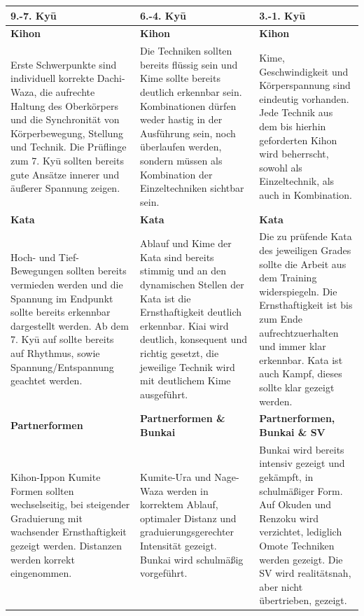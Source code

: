 \documentclass[a5paper,landscape,DIV=calc,11pt,notitlepage]{scrartcl}
\begin{document}
\begin{tcolorbox}[colback=white,colframe=GKD,coltitle=white,adjusted title=Entwicklungsweg entlang der Kyu-Grade]
	\null\vfill\null
	\begin{tabularx}{\linewidth}{XXX}
		9.-7. Ky\={u}	& 6.-4. Ky\={u}	& 3.-1. Ky\={u}\\
		\midrule
		{\footnotesize \textbf{Kihon}}&{\footnotesize \textbf{Kihon}}&{\footnotesize \textbf{Kihon}}\\
		{\footnotesize Erste Schwerpunkte sind individuell korrekte Dachi-Waza, die aufrechte Haltung des Oberkörpers und die Synchronität von Körperbewegung, Stellung und Technik. Die Prüflinge zum 7. Ky\={u} sollten bereits gute Ansätze innerer und äußerer Spannung zeigen.}&{\footnotesize Die Techniken sollten bereits flüssig sein und Kime sollte bereits deutlich erkennbar sein. Kombinationen dürfen weder hastig in der Ausführung sein, noch überlaufen werden, sondern müssen als Kombination der Einzeltechniken sichtbar sein.}&{\footnotesize Kime, Geschwindigkeit und Körperspannung sind eindeutig vorhanden. Jede Technik aus dem bis hierhin geforderten Kihon wird beherrscht, sowohl als Einzeltechnik, als auch in Kombination.}\\
		{\footnotesize \textbf{Kata}}&{\footnotesize \textbf{Kata}}&{\footnotesize \textbf{Kata}}\\
		{\footnotesize Hoch- und Tief-Bewegungen sollten bereits vermieden werden und die Spannung im Endpunkt sollte bereits erkennbar dargestellt werden. Ab dem 7. Ky\={u} auf sollte bereits auf Rhythmus, sowie Spannung/Entspannung geachtet werden.}&{\footnotesize Ablauf und Kime der Kata sind bereits stimmig und an den dynamischen Stellen der Kata ist die Ernsthaftigkeit deutlich erkennbar. Kiai wird deutlich, konsequent und richtig gesetzt, die jeweilige Technik wird mit deutlichem Kime ausgeführt.}&{\footnotesize Die zu prüfende Kata des jeweiligen Grades sollte die Arbeit aus dem Training widerspiegeln. Die Ernsthaftigkeit ist bis zum Ende aufrechtzuerhalten und immer klar erkennbar. Kata ist auch Kampf, dieses sollte klar gezeigt werden.}\\
		{\footnotesize \textbf{Partnerformen}}&{\footnotesize \textbf{Partnerformen \& Bunkai}}&{\footnotesize \textbf{Partnerformen, Bunkai \& SV}}\\
		{\footnotesize Kihon-Ippon Kumite Formen sollten wechselseitig, bei steigender Graduierung mit wachsender Ernsthaftigkeit gezeigt werden. Distanzen werden korrekt eingenommen.}&{\footnotesize Kumite-Ura und Nage-Waza werden in korrektem Ablauf, optimaler Distanz und graduierungsgerechter Intensität gezeigt. Bunkai wird schulmäßig vorgeführt.}&{\footnotesize Bunkai wird bereits intensiv gezeigt und gekämpft, in schulmäßiger Form. Auf \mbox{Okuden} und \mbox{Renzoku} wird verzichtet, lediglich \mbox{Omote} Techniken werden gezeigt. Die SV wird realitätsnah, aber nicht übertrieben, gezeigt.}
	\end{tabularx}\null\vfill\null
\end{tcolorbox}
\end{document}
